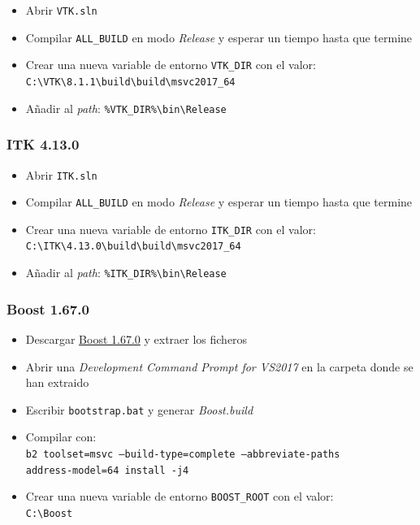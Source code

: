 \begin{itemize}
	\item Abrir \texttt{VTK.sln}
	\item Compilar \texttt{ALL\_BUILD} en modo \textit{Release} y esperar un tiempo hasta que termine
	\item Crear una nueva variable de entorno \texttt{VTK\_DIR} con el valor: \\ \texttt{C:\textbackslash VTK\textbackslash 8.1.1\textbackslash build\textbackslash build\textbackslash msvc2017\_64}
	\item Añadir al \textit{path}: \texttt{\%VTK\_DIR\%\textbackslash bin\textbackslash Release}
\end{itemize}

\subsubsection{ITK 4.13.0}

\begin{itemize}
	\item Abrir \texttt{ITK.sln}
	\item Compilar \texttt{ALL\_BUILD} en modo \textit{Release} y esperar un tiempo hasta que termine
	\item Crear una nueva variable de entorno \texttt{ITK\_DIR} con el valor: \\ \texttt{C:\textbackslash ITK\textbackslash 4.13.0\textbackslash build\textbackslash build\textbackslash msvc2017\_64}
	\item Añadir al \textit{path}: \texttt{\%ITK\_DIR\%\textbackslash bin\textbackslash Release}
\end{itemize}

\subsubsection{Boost 1.67.0}

\begin{itemize}	
	\item Descargar \href{http://sourceforge.net/projects/boost/files/boost/1.67.0/}{Boost 1.67.0} y extraer los ficheros
	\item Abrir una \textit{Development Command Prompt for VS2017} en la carpeta donde se han extraido
	\item Escribir \texttt{bootstrap.bat} y generar \textit{Boost.build}
	\item Compilar con: \\ \texttt{b2 toolset=msvc --build-type=complete --abbreviate-paths \\ address-model=64 install -j4}
	\item Crear una nueva variable de entorno \texttt{BOOST\_ROOT} con el valor: \\ \texttt{C:\textbackslash Boost}
\end{itemize}

